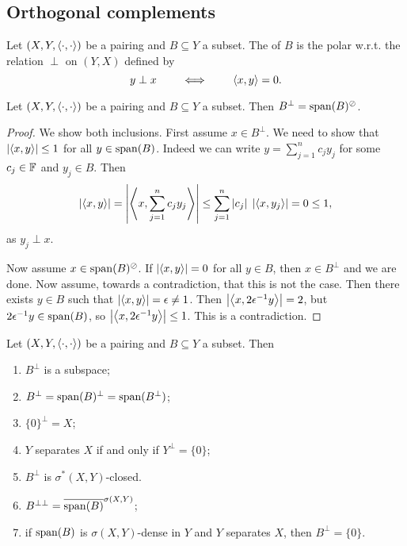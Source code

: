 \subsection{Orthogonal complements}
\begin{definition}
Let $\left( X,Y,\left\langle \cdot,\cdot \right\rangle \right)$ be a pairing and $B\subseteq Y$ a subset. The  of $B$ is the polar w.r.t. the relation $\perp$ on $(Y,X)$ defined by
\[ y\perp x \qquad\iff\qquad \left\langle x, y \right\rangle = 0. \]
\end{definition}

\begin{proposition} \label{perpAsPolar}
Let $\left( X,Y,\left\langle \cdot,\cdot \right\rangle \right)$ be a pairing and $B\subseteq Y$ a subset. Then $B^\perp = \operatorname{span}(B)^\oslash$.
\end{proposition}
\begin{proof}
We show both inclusions. First assume $x\in B^\perp$. We need to show that $\left|\left\langle x,y \right\rangle\right| \leq 1$ for all $y\in \operatorname{span}(B)$. Indeed we can write $y = \sum_{j=1}^n c_jy_j$ for some $c_j\in\mathbb{F}$ and $y_j\in B$. Then
\[ \left|\left\langle x,y \right\rangle\right| = \left|\left\langle x, \sum_{j=1}^n c_jy_j \right\rangle\right| \leq \sum_{j=1}^n |c_j|\;\left|\left\langle x, y_j \right\rangle\right| = 0 \leq 1, \]
as $y_j\perp x$.

Now assume $x\in \operatorname{span}(B)^\oslash$. If $\left|\left\langle x,y \right\rangle\right| = 0$ for all $y\in B$, then $x\in B^\perp$ and we are done. Now assume, towards a contradiction, that this is not the case. Then there exists $y\in B$ such that $\left|\left\langle x,y \right\rangle\right| = \epsilon \neq 1$. Then $\left|\left\langle x,2\epsilon^{-1}y \right\rangle\right| = 2$, but $2\epsilon^{-1}y\in\operatorname{span}(B)$, so $\left|\left\langle x,2\epsilon^{-1}y \right\rangle\right| \leq 1$. This is a contradiction.
\end{proof}
\begin{corollary} \label{corollaryPerpAsPolar}
Let $\left( X,Y,\left\langle \cdot,\cdot \right\rangle \right)$ be a pairing and $B\subseteq Y$ a subset. Then
\begin{enumerate}
\item $B^\perp$ is a subspace;
\item $B^\perp = \operatorname{span}(B)^\perp = \operatorname{span}(B^\perp)$;
\item $\{0\}^\perp = X$;
\item $Y$ separates $X$ \textup{if and only if} $Y^\perp = \{0\}$;
\item $B^\perp$ is $\sigma^*(X,Y)$-closed.
\item $B^{\perp\perp} = \overline{\operatorname{span}(B)}^{\sigma(X,Y)}$;
\item if $\operatorname{span}(B)$ is $\sigma(X,Y)$-dense in $Y$ and $Y$ separates $X$, then $B^\perp = \{0\}$.
\end{enumerate}
\end{corollary}
